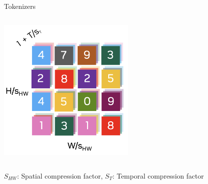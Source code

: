 \documentclass{beamer}
\begin{document}
\begin{frame}[t]{Tokenizers}
\begin{columns}[t]
\begin{column}{.5\textwidth}
            \vspace{-0.5em}
			\begin{center}
                \includegraphics[width=0.5\textwidth]{./img/tokenizer_discrete.png}
			\end{center}
		\end{column}
	\end{columns}
    $S_{HW}$: Spatial compression factor, $S_T$: Temporal compression factor
\end{frame}
\end{document}
